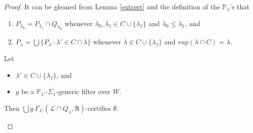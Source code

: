 \documentclass[12pt]{article}
\numberwithin{equation}{section}
\begin{document}
\begin{proof}
It can be gleaned from Lemma \ref{extcert} and the definition of the $\mathbb{P}_{\lambda}$'s that
\begin{enumerate}[label=(P\arabic*), leftmargin=40pt]
    \item\label{p1} $P_{\lambda_0} = P_{\lambda_1} \cap Q_{\lambda_0}$ whenever $\lambda_0, \lambda_1 \in C \cup \{\lambda_f\}$ and $\lambda_0 \leq \lambda_1$, and
    \item\label{p2} $P_{\lambda} = \bigcup \{P_{\lambda'} : \lambda' \in C \cap \lambda\}$ whenever $\lambda \in C \cup \{\lambda_f\}$ and $sup(\lambda \cap C) = \lambda$.
\end{enumerate}

\begin{lem}\label{modeldone}
Let 
\begin{itemize}
    \item $\lambda' \in C \cup \{\lambda_f\}$, and
    \item $g$ be a $\mathbb{P}_{\lambda'}$-$\Sigma_1$-generic filter over $W$.
\end{itemize}
Then $\bigcup g \ \Gamma_{\lambda'} (\mathcal{L} \cap Q_{\lambda}, \mathfrak{A}) \text{-certifies } \emptyset$.
\end{lem}


\end{proof}
\end{document}

